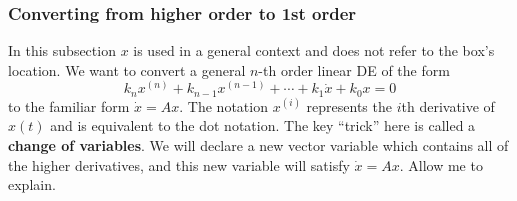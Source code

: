 \documentclass[11pt, oneside]{article}   	%
\begin{document}
\subsubsection*{Converting from higher order to 1st order}

In this subsection $x$ is used in a general context and does not refer to the box's location.
We want to convert a general $n$-th order linear DE of the form
\begin{equation} \label{eq:nthOrderDE}
  k_n x^{(n)}
  + k_{n-1} x^{(n-1)}
  + \cdots
  + k_{1} \dot{x}
  + k_{0} x
  = 0
\end{equation}
to the familiar form $\dot{x} = Ax$.
The notation $x^{(i)}$ represents the $i$th derivative of $x(t)$ and is equivalent to the dot notation.
The key ``trick'' here is called a \textbf{change of variables}.
We will declare a new vector variable which contains all of the higher derivatives,
and this new variable will satisfy $\dot{x} = Ax$.
Allow me to explain.
\end{document}
